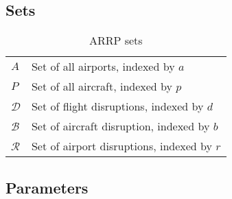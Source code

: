 \subsection{Sets}

\begin{table}[h!]
	\centering
	\caption{ARRP sets}
	\label{tbl:sets}
		
	\begin{tabular}{ll}
		\hline
		$A$   & Set of all airports, indexed by $a$   \\ 
		$P$   & Set of all aircraft, indexed by $p$   \\ 

		$\mathcal{D}$   & Set of flight disruptions, indexed by $d$ \\
		$\mathcal{B}$   & Set of aircraft disruption, indexed by $b$ \\
		$\mathcal{R}$	& Set of airport disruptions, indexed by $r$ \\
		\hline	
	\end{tabular}
\end{table}


\subsection{Parameters}


